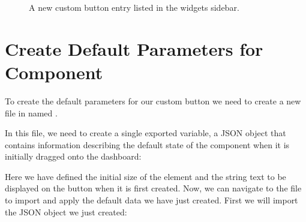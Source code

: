 \documentclass[letterpaper,10pt,english]{sphinxmanual}
\begin{document}
\begin{figure}[htbp]
\centering
\capstart

\noindent{}
\caption{A new custom button entry listed in the widgets sidebar.}\label{\detokenize{custom_component/add_entry:id1}}\label{\detokenize{custom_component/add_entry:add-entry}}\end{figure}

\begin{DUlineblock}{0em}
\item[] 
\end{DUlineblock}

\sphinxstepscope


\section{Create Default Parameters for Component}
\label{\detokenize{custom_component/default_parameters:create-default-parameters-for-component}}\label{\detokenize{custom_component/default_parameters::doc}}
\sphinxAtStartPar
To create the default parameters for our custom button we need to create a new file in  named .

\sphinxAtStartPar
In this file, we need to create a single exported variable, a JSON object that contains information describing the default state of the component when it is initially dragged onto the dashboard:

\begin{sphinxVerbatim}[commandchars=\\\{\},numbers=left,firstnumber=1,stepnumber=1]

\end{sphinxVerbatim}

\sphinxAtStartPar
Here we have defined the initial size of the element and the string text to be displayed on the button when it is first created. Now, we can navigate to the file  to import and apply the default data we have just created. First we will import the JSON object we just created:
\end{document}
